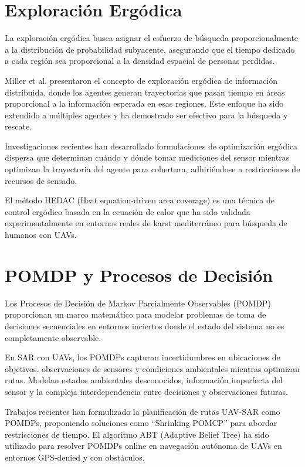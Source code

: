 \documentclass[12pt]{report} %
\begin{document}
\section{Exploración Ergódica}

La exploración ergódica busca asignar el esfuerzo de búsqueda proporcionalmente a la distribución de probabilidad subyacente, asegurando que el tiempo dedicado a cada región sea proporcional a la densidad espacial de personas perdidas\cite{miller2016, ivic2019}.

Miller et al.\cite{miller2016} presentaron el concepto de exploración ergódica de información distribuida, donde los agentes generan trayectorias que pasan tiempo en áreas proporcional a la información esperada en esas regiones. Este enfoque ha sido extendido a múltiples agentes y ha demostrado ser efectivo para la búsqueda y rescate.

Investigaciones recientes\cite{rao2023, seewald2024} han desarrollado formulaciones de optimización ergódica dispersa que determinan cuándo y dónde tomar mediciones del sensor mientras optimizan la trayectoria del agente para cobertura, adhiriéndose a restricciones de recursos de sensado.

El método HEDAC (Heat equation-driven area coverage)\cite{hedac2025} es una técnica de control ergódico basada en la ecuación de calor que ha sido validada experimentalmente en entornos reales de karst mediterráneo para búsqueda de humanos con UAVs.

\section{POMDP y Procesos de Decisión}

Los Procesos de Decisión de Markov Parcialmente Observables (POMDP) proporcionan un marco matemático para modelar problemas de toma de decisiones secuenciales en entornos inciertos donde el estado del sistema no es completamente observable\cite{ragi2018}.

En SAR con UAVs, los POMDPs capturan incertidumbres en ubicaciones de objetivos, observaciones de sensores y condiciones ambientales mientras optimizan rutas. Modelan estados ambientales desconocidos, información imperfecta del sensor y la compleja interdependencia entre decisiones y observaciones futuras.

Trabajos recientes han formulizado la planificación de rutas UAV-SAR como POMDPs, proponiendo soluciones como ``Shrinking POMCP'' para abordar restricciones de tiempo\cite{zhang2024}. El algoritmo ABT (Adaptive Belief Tree) ha sido utilizado para resolver POMDPs online en navegación autónoma de UAVs en entornos GPS-denied y con obstáculos\cite{sandino2020}.
\end{document}
